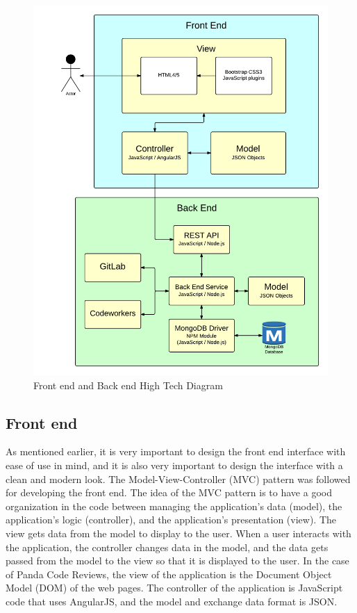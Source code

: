 \begin{figure}[H]
    \centering
    \includegraphics[width=\textwidth]{img/archi}
    \caption{Front end and Back end High Tech Diagram\label{fig:archi}}
\end{figure}

\subsection{Front end}

As mentioned earlier, it is very important to design the front end interface
with ease of use in mind, and it is also very important to design the interface
with a clean and modern look. The Model-View-Controller (MVC) pattern was
followed for developing the front end. The idea of the MVC pattern is to have a
good organization in the code between managing the application's data (model),
the application's logic (controller), and the application's presentation (view).
The view gets data from the model to display to the user. When a user interacts
with the application, the controller changes data in the model, and the data
gets passed from the model to the view so that it is displayed to the user. In
the case of Panda Code Reviews, the view of the application is the Document
Object Model (DOM) of the web pages. The controller of the application is
JavaScript code that uses AngularJS\cite{angular}, and the model and exchange
data format is JSON.

